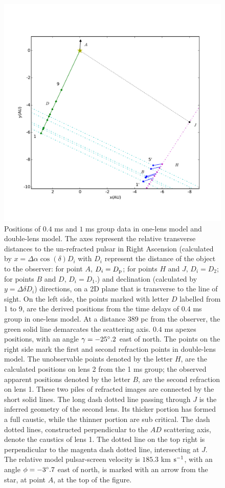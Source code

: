 \documentclass[useAMS,usenatbib]{mn2e}
\begin{document}
\begin{figure}
\centering
\includegraphics[width=7.5in]{Double_lens_xy.pdf}
\caption{Positions of $0.4$ ms and $1$ ms group data in one-lens model and double-lens model.  
The axes represent the relative transverse distances to the un-refracted pulsar in Right Ascension (calculated by $x= \Delta \alpha \cos(\delta)D_i$ with $D_i$ represent the distance of the object to the observer: for point $A$, $D_i=D_{\rm p}$; for points $H$ and $J$, $D_i=D_2$; for points $B$ and $D$, $D_i=D_1$.) and declination (calculated by $y=\Delta \delta D_i$) directions, on a 2D plane that is transverse to the line of sight. 
On the left side, the points marked with letter $D$ labelled from 1 to 9, are the derived
positions from the time delays of $0.4$ ms group in 
one-lens
model.  At a distance $389$ pc from the observer, the green solid line
demarcates the scattering axis.
$0.4$ ms apexes positions, with an angle $\gamma=-25\degree.2$ east of
north.  The points on the right side mark the first and second
refraction points in double-lens model.  
The unobservable points
denoted by the letter $H$, are the calculated positions on lens 2 from the
1
 ms group; the observed apparent positions denoted by the letter $B$, are the  
second refraction on lens 1.  
These two piles of
refracted images are connected by the short solid lines.  The long
dash dotted line passing through $J$ is the inferred geometry of the second
lens.  Its thicker portion has formed a full caustic, while the
thinner portion are sub critical.
The dash 
dotted lines, constructed perpendicular to the $AD$ scattering axis,
denote the caustics of lens 1.  The dotted line on the top right is
perpendicular to the magenta dash dotted line, intersecting at $J$.   
The relative model pulsar-screen velocity is $185.3$ km $\rm s^{-1}$, with an angle $\phi=-3\degree.7$ east of north, is marked with an arrow from the star, at point $A$, at the top of the figure.} 
\label{Doublelens}
\end{figure}
\end{document}
